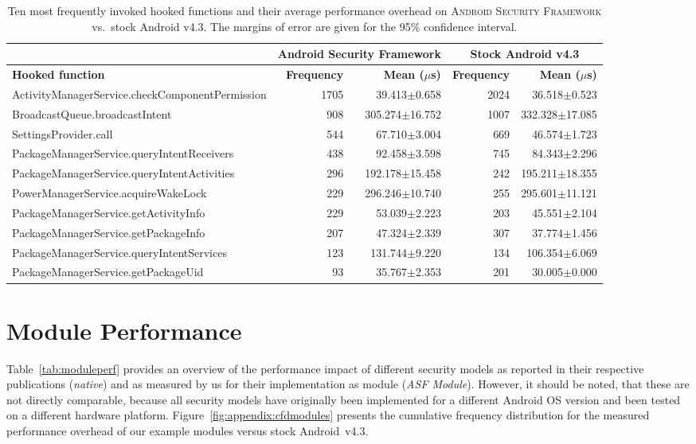 \documentclass[letterpaper,twocolumn,10pt]{article}
\newcommand{\OURNAME}{\textsc{Android Security Framework}\xspace}
\newcommand{\OURSHORT}{\textsc{ASF}\xspace}
\begin{document}
\begin{table*}[h]
  \centering
  \footnotesize
  \begin{tabular}{|l|r|r|r|r|}\cline{2-5}
    \multicolumn{1}{l}{} & \multicolumn{2}{|c|}{\textbf{Android Security Framework}} & \multicolumn{2}{c|}{\textbf{Stock Android v4.3}}\\\hline
    \textbf{Hooked function} & \textbf{Frequency} & \textbf{Mean ($\mu$s)}  & \textbf{Frequency} & \textbf{Mean ($\mu$s)}\\\hline\hline
    ActivityManagerService.checkComponentPermission & 1705 & 39.413$\pm$0.658 & 2024 & 36.518$\pm$0.523\\\hline
    BroadcastQueue.broadcastIntent & 908 & 305.274$\pm$16.752 & 1007 & 332.328$\pm$17.085\\\hline
    SettingsProvider.call & 544 & 67.710$\pm$3.004 & 669 & 46.574$\pm$1.723\\\hline
    PackageManagerService.queryIntentReceivers & 438 & 92.458$\pm$3.598 & 745 & 84.343$\pm$2.296\\\hline
    PackageManagerService.queryIntentActivities & 296 & 192.178$\pm$15.458 & 242 & 195.211$\pm$18.355\\\hline
    PowerManagerService.acquireWakeLock & 229 & 296.246$\pm$10.740 & 255 & 295.601$\pm$11.121\\\hline
    PackageManagerService.getActivityInfo & 229 & 53.039$\pm$2.223 & 203 & 45.551$\pm$2.104\\\hline
    PackageManagerService.getPackageInfo & 207 & 47.324$\pm$2.339 & 307 & 37.774$\pm$1.456\\\hline
    PackageManagerService.queryIntentServices & 123 & 131.744$\pm$9.220 & 134 & 106.354$\pm$6.069\\\hline
    PackageManagerService.getPackageUid & 93 & 35.767$\pm$2.353 & 201 & 30.005$\pm$0.000\\\hline
  \end{tabular}
  \caption{Ten most frequently invoked hooked functions and their average performance overhead on \OURNAME vs.~stock Android v4.3. The margins of error are given for the 95\% confidence interval.}
  \label{tab:eval:tophooks}
\end{table*}

\section{Module Performance}
\label{sec:appendix:moduleperf}

Table~\ref{tab:moduleperf} provides an overview of the performance impact of different security models as reported in their respective publications (\textit{native}) and as measured by us for their implementation as module (\textit{\OURSHORT Module}). However, it should be noted, that these are not directly comparable, because all security models have originally been implemented for a different Android OS version and been tested on a different hardware platform. Figure~\ref{fig:appendix:cfdmodules} presents the cumulative frequency distribution for the measured performance overhead of our example modules versus stock Android~v4.3.
\end{document}
